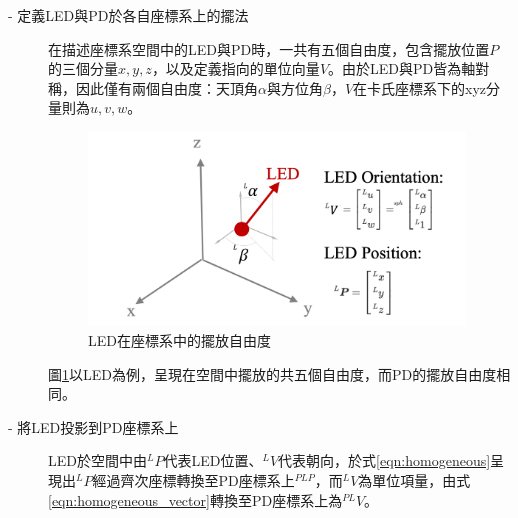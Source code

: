     \begin{description}

        \item[- 定義LED與PD於各自座標系上的擺法]\hfill 
        
        \qquad
        在描述座標系空間中的LED與PD時，一共有五個自由度，包含擺放位置$P$的三個分量$x,y,z$，以及定義指向的單位向量$V$。由於LED與PD皆為軸對稱，因此僅有兩個自由度：天頂角$\alpha$與方位角$\beta$，$V$在卡氏座標系下的xyz分量則為$u,v,w$。

        \begin{figure}[ht]
            \centering
            \includegraphics[width=10cm]{ch2pic/LED_config.png}
            \caption{LED在座標系中的擺放自由度}
            \label{pic:led_config}
        \end{figure}

        \qquad
        圖\ref{pic:led_config}以LED為例，呈現在空間中擺放的共五個自由度，而PD的擺放自由度相同。

        \item[- 將LED投影到PD座標系上]\hfill 
        
        \qquad
        LED於空間中由$^L P$代表LED位置、$^L V$代表朝向，於式\ref{eqn:homogeneous}呈現出$^L P$經過齊次座標轉換至PD座標系上$^{PL P}$，而$^L V$為單位項量，由式\ref{eqn:homogeneous_vector}轉換至PD座標系上為$^{PL}V$。


\end{description}
